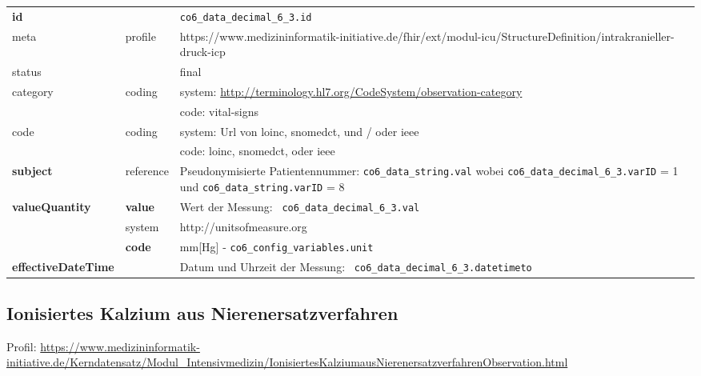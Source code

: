 \begin{longtable}{|l|l|p{7.5cm}|}
        \hline
        \rowcolor{lightgray} \multicolumn{3}{|l|}{Data Mapping (inhaltlich)} \\ \hline
        \textbf{id} &  & \texttt{co6\_data\_decimal\_6\_3.id} \\ \hline
	meta & profile & https://www.medizininformatik-initiative.de/fhir/ext/modul-icu/StructureDefinition/intrakranieller-druck-icp \\ \hline 
	status &  & final   \\ \hline 
	category & coding & system: \url{http://terminology.hl7.org/CodeSystem/observation-category} \\
\cline{3-3}
	& & code: vital-signs \\ \hline
	code & coding & system: Url von \ac{loinc}, \ac{snomedct}, und / oder \ac{ieee} \\ 
	\cline{3-3} 
	 &  & code: \ac{loinc}, \ac{snomedct}, oder \ac{ieee} \\ \hline
	 \textbf{subject} & reference & Pseudonymisierte Patientennummer: \texttt{co6\_data\_string.val} wobei \texttt{co6\_data\_decimal\_6\_3.varID} = 1 und \texttt{co6\_data\_string.varID} = 8 \\ \hline
	 \textbf{valueQuantity}  & \textbf{value} & Wert der Messung: \texttt{
co6\_data\_decimal\_6\_3.val} \\
        \cline{2-3}
         & system & http://unitsofmeasure.org \\
         \cline{2-3}
         & \textbf{code} & mm[Hg] - \texttt{co6\_config\_variables.unit} \\ \hline
     \textbf{effectiveDateTime}  & & Datum und Uhrzeit der Messung: \texttt{
co6\_data\_decimal\_6\_3.datetimeto} \\
     \hline
\end{longtable}

\subsection{Ionisiertes Kalzium aus Nierenersatzverfahren} 
Profil: \url{https://www.medizininformatik-initiative.de/Kerndatensatz/Modul_Intensivmedizin/IonisiertesKalziumausNierenersatzverfahrenObservation.html}

